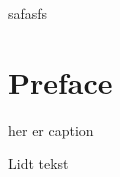 \documentclass[danish,oldfontcommands]{ermreport}
\begin{document}
\coverpage
  \frontmatter
  \titlepage
  \trustpage
\begin{resume}
 safasfs
\end{resume}
\chapter{Preface}


\begin{boks}
\caption{her er caption}
Lidt tekst
\end{boks}
\end{document}
